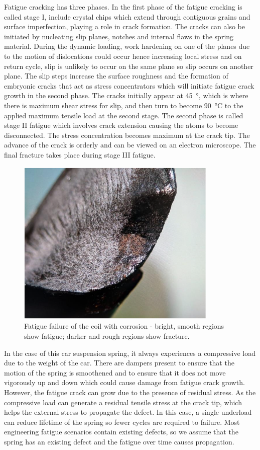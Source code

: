 \documentclass[11pt]{article}
\begin{document}
Fatigue cracking has three phases. In the first phase of the fatigue cracking is called stage I, include crystal chips which extend through contiguous grains and surface imperfection, playing a role in crack formation. The cracks can also be initiated by nucleating slip planes, notches and internal flaws in the spring material. During the dynamic loading, work hardening on one of the planes due to the motion of dislocations could occur hence increasing local stress and on return cycle, slip is unlikely to occur on the same plane so slip occurs on another plane. The slip steps increase the surface roughness and the formation of embryonic cracks that act as stress concentrators which will initiate fatigue crack growth in the second phase. The cracks initially appear at \SI{45}{\degree}, which is where there is maximum shear stress for slip, and then turn to become \SI{90}{\celsius} to the applied maximum tensile load at the second stage. The second phase is called stage II fatigue which involves crack extension causing the atoms to become disconnected. The stress concentration becomes maximum at the crack tip. The advance of the crack is orderly and can be viewed on an electron microscope. The final fracture takes place during stage III fatigue. 
\begin{figure}[H]
    \centering
    \includegraphics[height = 8cm]{./img/fatigue1.png}
    \caption{Fatigue failure of the coil with corrosion - bright, smooth regions show fatigue; darker and rough regions show fracture.}
    \label{fig:fatigue1}
\end{figure}
In the case of this car suspension spring, it always experiences a compressive load due to the weight of the car. There are dampers present to ensure that the motion of the spring is smoothened and to ensure that it does not move vigorously up and down which could cause damage from fatigue crack growth. However, the fatigue crack can grow due to the presence of residual stress. As the compressive load can generate a residual tensile stress at the crack tip, which helps the external stress to propagate the defect. In this case, a single underload can reduce lifetime of the spring so fewer cycles are required to failure. Most engineering fatigue scenarios contain existing defects, so we assume that the spring has an existing defect and the fatigue over time causes propagation.
\end{document}

